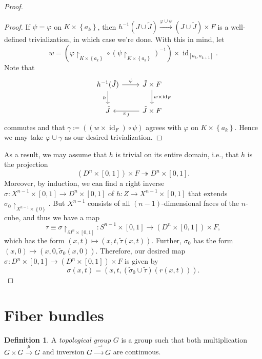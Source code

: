 \documentclass[10pt,letterpaper,cm]{nupset}
\theoremstyle{definition}
\newtheorem{defn}{Definition}[subsection]
\theoremstyle{theorem}
\theoremstyle{remark}
\newcommand{\1}{\mathbb{1}}
\newcommand{\0}{\vec 0}
\DeclareMathOperator{\id}{id}
\begin{document}
\begin{proof}
\begin{proof}
If $\psi =\varphi$ on $K\times \left\{a_k\right\}$, then $h^{-1}(J\cup \tilde{J}) \overset{\varphi \cup \psi}{\longrightarrow} \left(J \cup \tilde{J}\right) \times F$ is a well-defined trivialization, in which case we're done. With this in mind, let
\[
w = \left(\varphi\restriction_{K\times \left\{a_k\right\}} \circ \left(\psi\restriction_{K\times \left\{a_k\right\}}\right)^{-1}\right) \times \id_{\left[a_k, a_{k+1}\right]}
.\]
Note that 
\[
\begin{tikzcd}
h^{-1}(\tilde{J}) \arrow[r, "\psi"] \arrow[d, "h"'] & \tilde{J}\times F \arrow[d, "w \times \id_F"]               \\
\tilde{J}                                           & \tilde{J}\times F \arrow[l, "\pi_{\tilde{J}}"]
\end{tikzcd}
\] commutes and that $\gamma \coloneqq \left(\left(w \times \id_F\right) \circ \psi\right)$ agrees with $\varphi$ on $K\times \left\{a_k\right\}$. Hence we may take $\varphi \cup \gamma$ as our desired trivialization.
\end{proof}
As a result, we may assume that $h$ is trivial on its entire domain, i.e., that $h$ is the projection $$\left(D^n \times \left[0,1\right]\right) \times F \twoheadrightarrow D^n \times \left[0,1\right].$$ Moreover, by induction, we can find a right inverse $\sigma : X^{n-1} \times \left[0,1\right] \to D^n \times \left[0,1\right]$ of $h : Z \to X^{n-1} \times \left[0,1\right]$ that extends $\sigma_0\restriction_{X^{n-1}\times \left\{0\right\}}$. But $X^{n-1}$ consists of all $\left(n-1\right)$-dimensional faces of the $n$-cube, and thus we have a map $$\tau \equiv \sigma \restriction_{\partial{I^n} \times \left[0,1\right]} : S^{n-1} \times  \left[0,1\right]   \to  \left(D^n \times \left[0,1\right]\right) \times F,$$ which has the form $\left(x,t\right) \mapsto \left(x,t,\tilde{\tau}(x,t)\right)$. Further, $\sigma_0$ has the form $\left(x,0\right) \mapsto \left(x,0, \tilde{\sigma}_0(x,0)\right)$. Therefore, our desired map $\sigma :  D^n \times \left[0,1\right] \to \left(D^n \times \left[0,1\right]\right) \times F $  is given by 
\[
\sigma(x,t) = \left(x,t, \left(\tilde{\sigma}_0 \cup \tilde{\tau}\right)(r(x,t))\right).
\]
\end{proof}


\section{Fiber bundles}

\begin{defn}
A \textit{topological group} $G$ is a group such that both multiplication $G \times G \overset{\mu}{\longrightarrow} G$ and inversion $G \overset{{-}^{-1}}{\longrightarrow} G$ are continuous.
\end{defn}
\end{document}
